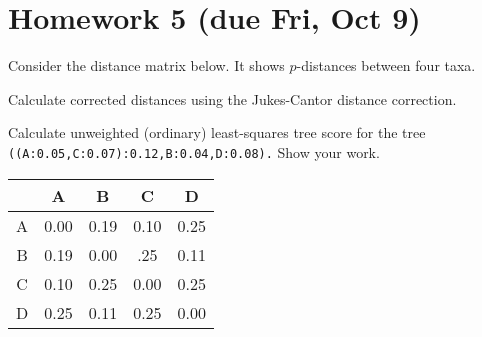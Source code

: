 \documentclass[landscape]{foils}
\begin{document}
\pagecolor{white}


\section*{Homework 5 (due Fri, Oct 9)}
\begin{compactenum}
	\item Consider the distance matrix below.  It shows $p$-distances between four taxa.
	\item Calculate corrected distances using the Jukes-Cantor distance correction.
	\item Calculate unweighted (ordinary) least-squares tree score for the tree {\tt ((A:0.05,C:0.07):0.12,B:0.04,D:0.08).}   Show your work.
\end{compactenum}
\begin{table}[htdp]
\begin{center}
\begin{tabular}{|c|c|c|c|c|}
\hline 
 & A & B & C & D  \\ 
\hline 
A & 0.00 & 0.19 & 0.10 & 0.25\\
B & 0.19 & 0.00 & .25 & 0.11 \\
C & 0.10 & 0.25 & 0.00 & 0.25 \\
D & 0.25 & 0.11 & 0.25 & 0.00\\
\hline 
\end{tabular}
\end{center}
\end{table}
\end{document}
